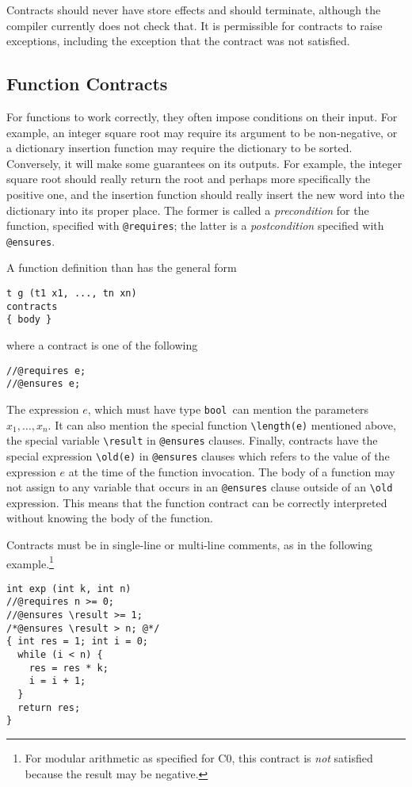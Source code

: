 \documentclass[11pt]{article}
\newcommand{\tbool}{\texttt{bool}}
\begin{document}
Contracts should never have store effects and should terminate,
although the compiler currently does not check that.  It is
permissible for contracts to raise exceptions, including the exception
that the contract was not satisfied.

\subsection{Function Contracts}

For functions to work correctly, they often impose conditions on their
input.  For example, an integer square root may require its argument
to be non-negative, or a dictionary insertion function may require
the dictionary to be sorted.  Conversely, it will make some guarantees
on its outputs.  For example, the integer square root should really
return the root and perhaps more specifically the positive one, and
the insertion function should really insert the new word into the
dictionary into its proper place.  The former is called a
\emph{precondition} for the function, specified with \verb'@requires';
the latter is a \emph{postcondition} specified with \verb'@ensures'.

A function definition than has the general form
\begin{verbatim}
t g (t1 x1, ..., tn xn)
contracts
{ body }
\end{verbatim}
where a contract is one of the following
\begin{verbatim}
//@requires e;
//@ensures e;
\end{verbatim}
The expression $e$, which must have type \tbool\ can mention the
parameters $x_1, \ldots, x_n$.  It can also mention the special
function \verb'\length(e)' mentioned above, the special variable
\verb'\result' in \verb'@ensures' clauses.  Finally, contracts have
the special expression \verb'\old(e)' in \verb'@ensures' clauses which
refers to the value of the expression $e$ at the time of the function
invocation.  The body of a function may not assign to any variable
that occurs in an \verb'@ensures' clause outside of an \verb'\old'
expression.  This means that the function contract can be correctly
interpreted without knowing the body of the function.

Contracts must be in single-line or multi-line comments, as in the
following example.\footnote{For modular arithmetic as specified
for C0, this contract is \emph{not} satisfied because the result may be
negative.}
\begin{verbatim}
int exp (int k, int n)
//@requires n >= 0;
//@ensures \result >= 1;
/*@ensures \result > n; @*/
{ int res = 1; int i = 0;
  while (i < n) {
    res = res * k;
    i = i + 1;
  }
  return res;
}
\end{verbatim}
\end{document}
